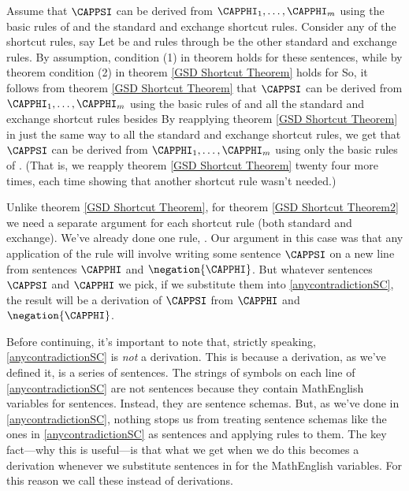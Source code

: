 \begin{PROOF}
Assume that $\CAPPSI$ can be derived from $\CAPPHI_1,\ldots,\CAPPHI_{\integer{m}}$ using the basic rules of \GSD{} and the standard and exchange shortcut rules. 
Consider any of the shortcut rules, say  
Let  be  and rules  through  be the other standard and exchange rules.
By assumption, condition (1) in theorem  holds for these sentences, while by theorem  condition (2) in theorem \ref{GSD Shortcut Theorem} holds for  
So, it follows from theorem \ref{GSD Shortcut Theorem} that $\CAPPSI$ can be derived from $\CAPPHI_1,\ldots,\CAPPHI_{\integer{m}}$ using the basic rules of \GSD{} and all the standard and exchange shortcut rules besides  By reapplying theorem \ref{GSD Shortcut Theorem} in just the same way to all the standard and exchange shortcut rules, we get that $\CAPPSI$ can be derived from $\CAPPHI_1,\ldots,\CAPPHI_{\integer{m}}$ using only the basic rules of \GSD{}. 
(That is, we reapply theorem \ref{GSD Shortcut Theorem} twenty four more times, each time showing that another shortcut rule wasn't needed.)
\end{PROOF}

\bigskip
\noindent{}Unlike theorem \ref{GSD Shortcut Theorem}, for theorem \ref{GSD Shortcut Theorem2} we need a separate argument for each shortcut rule (both standard and exchange). 
We've already done one rule, . 
Our argument in this case was that any application of the rule will involve writing some sentence $\CAPPSI$ on a new line from sentences $\CAPPHI$ and $\negation{\CAPPHI}$. 
But whatever sentences $\CAPPSI$ and $\CAPPHI$ we pick, if we substitute them into \ref{anycontradictionSC}, the result will be a derivation of $\CAPPSI$ from $\CAPPHI$ and $\negation{\CAPPHI}$. 

Before continuing, it's important to note that, strictly speaking, \ref{anycontradictionSC} is \emph{not} a derivation. 
This is because a derivation, as we've defined it, is a series of \GSL{} sentences. 
The strings of symbols on each line of \ref{anycontradictionSC} are not \GSL{} sentences because they contain MathEnglish variables for \GSL{} sentences. 
Instead, they are sentence schemas.
But, as we've done in \ref{anycontradictionSC}, nothing stops us from treating sentence schemas like the ones in \ref{anycontradictionSC} as \GSL{} sentences and applying rules to them. 
The key fact---why this is useful---is that what we get when we do this becomes a derivation whenever we substitute \GSL{} sentences in for the MathEnglish variables. 
For this reason we call these   instead of derivations. 

